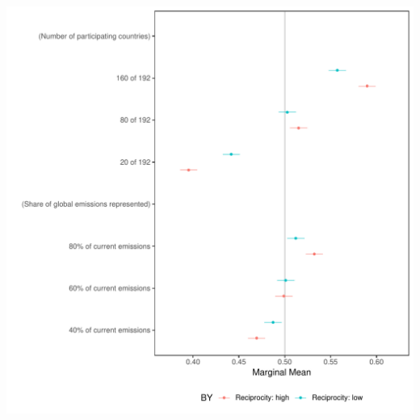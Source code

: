 \documentclass[a4paper,12pt]{article}\usepackage[]{graphicx}\usepackage[]{color}
\makeatletter
\def\maxwidth{ %
  \ifdim\Gin@nat@width>\linewidth
    \linewidth
  \else
    \Gin@nat@width
  \fi
}
\newenvironment{knitrout}{}{} %
\makeatother
\begin{document}
\begin{knitrout}
\color{fgcolor}
\includegraphics[width=\maxwidth]{figure/bechtel_reciprocity_reference-1} 

\end{knitrout}
\end{document}
